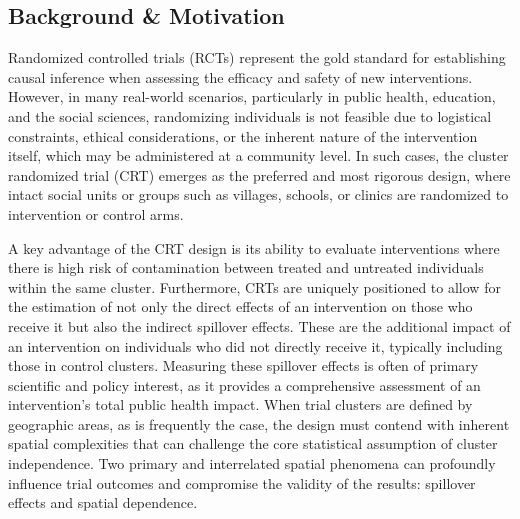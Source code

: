 \documentclass{article}[11pt]
\providecommand{\DIFdelend}{} %
\DeclareRobustCommand{\DIFdelend}{\DIFOaddend \let\includegraphics\DIFOincludegraphics} %
\begin{document}
\DIFdelend \subsection{Background \& Motivation}

Randomized controlled trials (RCTs) represent the gold standard for establishing causal inference when assessing the efficacy and safety of new interventions\cite{pocock_clinical_1983}\cite{smith_field_2015}. However, in many real-world scenarios, particularly in public health, education, and the social sciences, randomizing individuals is not feasible due to logistical constraints, ethical considerations, or the inherent nature of the intervention itself, which may be administered at a community level. In such cases, the cluster randomized trial (CRT) emerges as the preferred and most rigorous design, where intact social units or groups such as villages, schools, or clinics are randomized to intervention or control arms\cite{hayes_cluster_2017}\cite{donner_design_2000}.

A key advantage of the CRT design is its ability to evaluate interventions where there is high risk of contamination between treated and untreated individuals within the same cluster\cite{hayes_cluster_2017}\cite{hudgens_toward_2008}. Furthermore, CRTs are uniquely positioned to allow for the estimation of not only the direct effects of an intervention on those who receive it but also the indirect spillover effects. These are the additional impact of an intervention on individuals who did not directly receive it, typically including those in control clusters. Measuring these spillover effects is often of primary scientific and policy interest, as it provides a comprehensive assessment of an intervention's total public health impact\cite{hayes_cluster_2017}\cite{hayes_design_2000}. When trial clusters are defined by geographic areas, as is frequently the case, the design must contend with inherent spatial complexities that can challenge the core statistical assumption of cluster independence. Two primary and interrelated spatial phenomena can profoundly influence trial outcomes and compromise the validity of the results: spillover effects and spatial dependence\cite{hayes_cluster_2017}\cite{smith_field_2015}.
\end{document}
